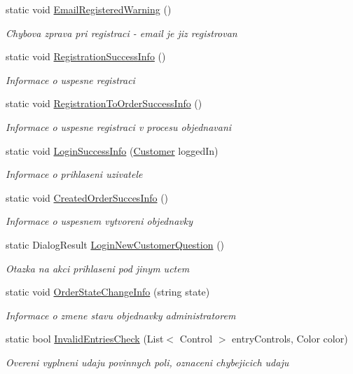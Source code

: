 \begin{DoxyCompactItemize}
static void \mbox{\hyperlink{class_eshop_1_1_message_aa0408274ba9f49a4083f9b92e0750613}{Email\+Registered\+Warning}} ()
\begin{DoxyCompactList}\small\item\em Chybova zprava pri registraci -\/ email je jiz registrovan \end{DoxyCompactList}\item 
static void \mbox{\hyperlink{class_eshop_1_1_message_ad51bfaf42591c9b99562d18493cd0941}{Registration\+Success\+Info}} ()
\begin{DoxyCompactList}\small\item\em Informace o uspesne registraci \end{DoxyCompactList}\item 
static void \mbox{\hyperlink{class_eshop_1_1_message_adaf1da11f78e3212111dc58cf2ac34bb}{Registration\+To\+Order\+Success\+Info}} ()
\begin{DoxyCompactList}\small\item\em Informace o uspesne registraci v procesu objednavani \end{DoxyCompactList}\item 
static void \mbox{\hyperlink{class_eshop_1_1_message_aa6688b49480807d22a54941fd213fd97}{Login\+Success\+Info}} (\mbox{\hyperlink{class_eshop_1_1_customer}{Customer}} logged\+In)
\begin{DoxyCompactList}\small\item\em Informace o prihlaseni uzivatele \end{DoxyCompactList}\item 
static void \mbox{\hyperlink{class_eshop_1_1_message_a30072f121d6e675a3a811155c6e255c1}{Created\+Order\+Succes\+Info}} ()
\begin{DoxyCompactList}\small\item\em Informace o uspesnem vytvoreni objednavky \end{DoxyCompactList}\item 
static Dialog\+Result \mbox{\hyperlink{class_eshop_1_1_message_a61bf9f2dade0aae2da655784c9527206}{Login\+New\+Customer\+Question}} ()
\begin{DoxyCompactList}\small\item\em Otazka na akci prihlaseni pod jinym uctem \end{DoxyCompactList}\item 
static void \mbox{\hyperlink{class_eshop_1_1_message_a4e2447f5c0bab152ff87165a878b0682}{Order\+State\+Change\+Info}} (string state)
\begin{DoxyCompactList}\small\item\em Informace o zmene stavu objednavky administratorem \end{DoxyCompactList}\item 
static bool \mbox{\hyperlink{class_eshop_1_1_message_a39bfc2274d5690fd3c70f213fa048651}{Invalid\+Entries\+Check}} (List$<$ Control $>$ entry\+Controls, Color color)
\begin{DoxyCompactList}\small\item\em Overeni vyplneni udaju povinnych poli, oznaceni chybejicich udaju \end{DoxyCompactList}\end{DoxyCompactItemize}


